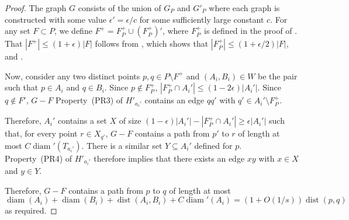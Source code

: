 \documentclass{patmorin}
\DeclareMathOperator{\diam}{diam}
\DeclareMathOperator{\dist}{dist}
\begin{document}
\begin{proof}
  The graph $G$ consists of the union of $G_P$ and $G'_P$ where each
  graph is constructed with some value $\epsilon' = \epsilon/c$ for
  some sufficiently large constant $c$.  For any set $F\subset P$, we
  define $F^+ = F^+_P \cup (F^+_P)'$, where $F^+_P$ is defined in the
  proof of .  That $|F^+| \le (1+\epsilon)|F|$
  follows from , which shows that $|F^+_P|\le
  (1+\epsilon/2)|F|$, and .

  Now, consider any two distinct points $p,q\in P\setminus F^+$ and
  $(A_i,B_i)\in W$ be the pair such that $p\in A_i$ and $q\in B_i$.
  Since $p\not\in F^+_P$, $|F^+_P\cap A_i'|\le (1-2\epsilon)|A_i'|$.
  Since $q\not\in F'$, $G-F$ Property~(PR3) of $H'_{a_i'}$ contains
  an edge $qq'$ with $q'\in A_i'\setminus F^+_P$.

  Therefore, $A_i'$ contains a set $X$ of size
  $(1-\epsilon)|A_i'|-|F^+_P\cap A_i'|\ge \epsilon|A_i'|$ such that, for
  every point $r\in X_{q'}$, $G-F$ contains a path from $p'$ to $r$ of
  length at most $C\diam'(T_{a_i'})$.  There is a similar set $Y\subseteq
  A_i'$ defined for $p$.  Property~(PR4) of $H'_{a_i'}$ therefore implies
  that there exists an edge $xy$ with $x\in X$ and $y\in Y$.

  Therefore, $G-F$ contains a path from $p$ to $q$ of length at most
  \[  \diam(A_i) + \diam(B_i) + \dist(A_i,B_i) + C\diam'(A_i) = (1+O(1/s))\dist(p,q)
  \]
  as required.
\end{proof}




\end{document}
